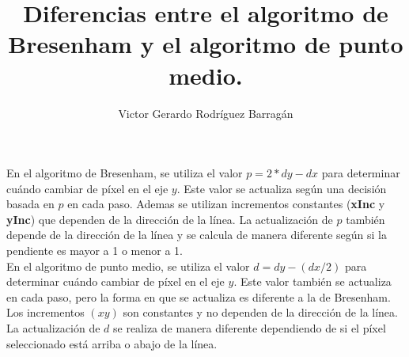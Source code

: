 \documentclass{article}
\title{Diferencias entre el algoritmo de Bresenham y el algoritmo de punto medio.}
\author{Victor Gerardo Rodríguez Barragán}
\date{}
\begin{document}
\maketitle
\justify

En el algoritmo de Bresenham, se utiliza el valor $p = 2 * dy - dx$ para determinar cuándo cambiar
de píxel en el eje $y$. Este valor se actualiza según una decisión basada en $p$ en cada paso. Ademas
se utilizan incrementos constantes (\textbf{xInc} y \textbf{yInc}) que dependen de la dirección de la línea. La actualización
de $p$ también depende de la dirección de la línea y se calcula de manera diferente según si la pendiente es mayor a 1 o menor a 1.
\vspace{0.25cm}\\
En el algoritmo de punto medio, se utiliza el valor $d = dy - (dx / 2)$ para determinar cuándo cambiar
de píxel en el eje $y$. Este valor también se actualiza en cada paso, pero la forma en que se actualiza es diferente a la de Bresenham.
Los incrementos $(x y)$ son constantes y no dependen de la dirección de la línea. La actualización de $d$ se realiza de manera diferente
dependiendo de si el píxel seleccionado está arriba o abajo de la línea.
\end{document}
